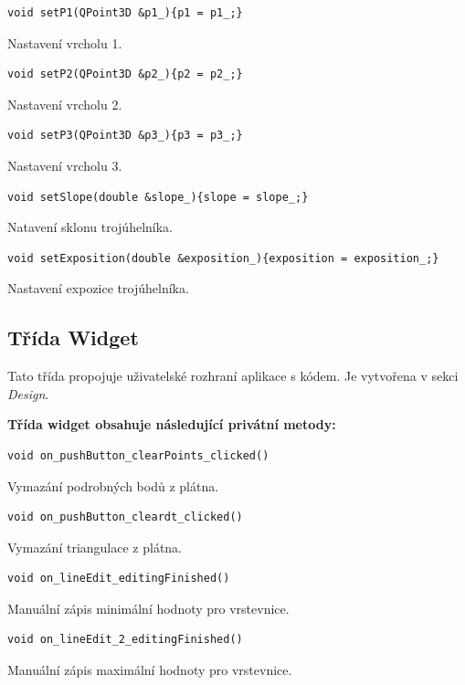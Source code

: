 \documentclass[a4paper, 12pt, oneside, titlepage]{article} %
\begin{document}
\begin{verbatim}
void setP1(QPoint3D &p1_){p1 = p1_;}
\end{verbatim}
Nastavení vrcholu 1.\\

\begin{verbatim}
void setP2(QPoint3D &p2_){p2 = p2_;}
\end{verbatim}
Nastavení vrcholu 2.\\

\begin{verbatim}
void setP3(QPoint3D &p3_){p3 = p3_;}
\end{verbatim}
Nastavení vrcholu 3.\\

\begin{verbatim}
void setSlope(double &slope_){slope = slope_;}
\end{verbatim}
Natavení sklonu trojúhelníka.\\

\begin{verbatim}
void setExposition(double &exposition_){exposition = exposition_;}
\end{verbatim}
Nastavení expozice trojúhelníka.\\


\subsection{Třída Widget}
Tato třída propojuje uživatelské rozhraní aplikace s kódem. Je vytvořena v sekci \emph{Design}.

\textbf{Třída widget obsahuje následující privátní metody:}
\begin{verbatim}
void on_pushButton_clearPoints_clicked()
\end{verbatim}
Vymazání podrobných bodů z plátna.\\

\begin{verbatim}
void on_pushButton_cleardt_clicked()
\end{verbatim}
Vymazání triangulace z plátna.\\

\begin{verbatim}
void on_lineEdit_editingFinished()
\end{verbatim}
Manuální zápis minimální hodnoty pro vrstevnice.\\

\begin{verbatim}
void on_lineEdit_2_editingFinished()
\end{verbatim}
Manuální zápis maximální hodnoty pro vrstevnice.\\
\end{document}
